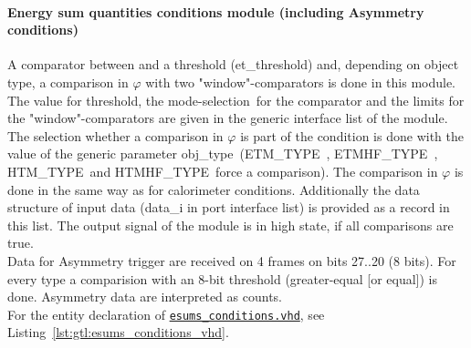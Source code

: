 \paragraph{Energy sum quantities conditions module (including Asymmetry conditions)}

A comparator between \et and a threshold (et\_threshold) and, depending on object type, a comparison in $\varphi$ with
two "window"-comparators is done in this module.
The value for \et threshold, the \textquotesingle mode-selection\textquotesingle\  for the \et comparator and the limits for the "window"-comparators are given in the generic interface list of the module.
The selection whether a comparison in $\varphi$ is part of the condition is done with the value of the generic parameter \textquotesingle obj\_type\textquotesingle\
(\textquotesingle ETM\_TYPE\textquotesingle\ , \textquotesingle ETMHF\_TYPE\textquotesingle\ , \textquotesingle HTM\_TYPE\textquotesingle\ and \textquotesingle HTMHF\_TYPE\textquotesingle\ force a comparison).
The comparison in $\varphi$ is done in the same way as for calorimeter conditions.
Additionally the data structure of input data (data\_i in port interface list) is provided
as a record in this list. The output signal of the module is in high state, if all comparisons are true.\\
Data for Asymmetry trigger are received on 4 frames on bits 27..20 (8 bits). For every type a comparision with an 8-bit threshold (greater-equal [or equal]) is done.
Asymmetry data are interpreted as counts.\\
For the entity declaration of \href{\gitbranch/firmware/hdl/gt_mp7_core/gtl_fdl_wrapper/gtl/esums_conditions.vhd}{\texttt{\textquotesingle esums\_conditions.vhd\textquotesingle }}, see Listing~\ref{lst:gtl:esums_conditions_vhd}.

\clearpage



